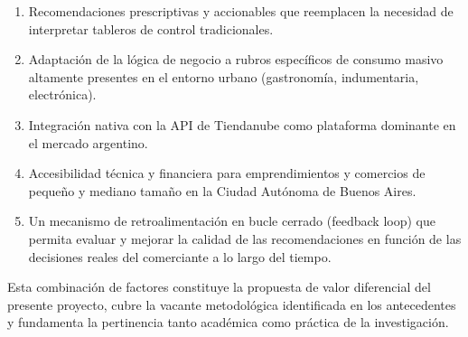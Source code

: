 \begin{enumerate}
    \item Recomendaciones prescriptivas y accionables que reemplacen la necesidad de interpretar tableros de control tradicionales.

    \item Adaptación de la lógica de negocio a rubros específicos de consumo masivo altamente presentes en el entorno urbano (gastronomía, indumentaria, electrónica).

    \item Integración nativa con la API de Tiendanube como plataforma dominante en el mercado argentino.

    \item Accesibilidad técnica y financiera para emprendimientos y comercios de pequeño y mediano tamaño en la Ciudad Autónoma de Buenos Aires.

    \item Un mecanismo de retroalimentación en bucle cerrado (feedback loop) que permita evaluar y mejorar la calidad de las recomendaciones en función de las decisiones reales del comerciante a lo largo del tiempo.
\end{enumerate}

Esta combinación de factores constituye la propuesta de valor diferencial del presente proyecto, cubre la vacante metodológica identificada en los antecedentes y fundamenta la pertinencia tanto académica como práctica de la investigación.
